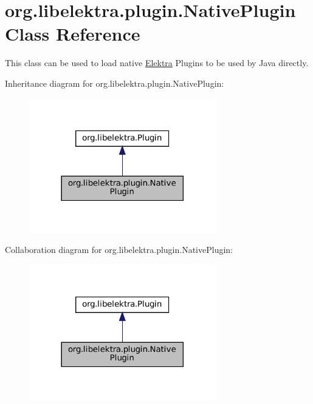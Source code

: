 \hypertarget{classorg_1_1libelektra_1_1plugin_1_1NativePlugin}{}\section{org.\+libelektra.\+plugin.\+Native\+Plugin Class Reference}
\label{classorg_1_1libelektra_1_1plugin_1_1NativePlugin}


This class can be used to load native \mbox{\hyperlink{interfaceorg_1_1libelektra_1_1Elektra}{Elektra}} Plugins to be used by Java directly.  




Inheritance diagram for org.\+libelektra.\+plugin.\+Native\+Plugin\+:
\nopagebreak
\begin{figure}[H]
\begin{center}
\leavevmode
\includegraphics[width=230pt]{classorg_1_1libelektra_1_1plugin_1_1NativePlugin__inherit__graph}
\end{center}
\end{figure}


Collaboration diagram for org.\+libelektra.\+plugin.\+Native\+Plugin\+:
\nopagebreak
\begin{figure}[H]
\begin{center}
\leavevmode
\includegraphics[width=230pt]{classorg_1_1libelektra_1_1plugin_1_1NativePlugin__coll__graph}
\end{center}
\end{figure}

